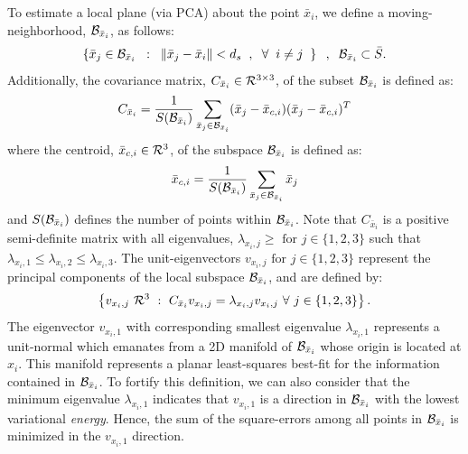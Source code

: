 		To estimate a local plane (via PCA) about the point $\bar{x}_{i}$, we define a moving-neighborhood, ${\cal B}_{\bar{x}_{i}}$, as follows:
			\newcommand{\xball}{\mmathcal{B}_{\bar{x}_{i}}}
			\begin{equation}
				\setwrap{ \bar{x}_{j} \in \xball \SSep : \SSep \norm{\bar{x}_{j}-\bar{x}_{i}} < d_{s}\SSep , \SSep \forall \SSep i\neq j \SSep }\SSep,\SSep \xball \subset \bar{S}.
				\label{eq::pca_ball}
			\end{equation}
		Additionally, the covariance matrix, $C_{\bar{x}_{i}} \in {\cal R}^{3\times3}$, of the subset $\xball$ is defined as:
			\begin{equation}
				C_{\bar{x}_{i}} =
				\frac{1}{S(\xball)} \sum_{\bar{x}_{j} \in \xball } ( \bar{x}_{j} - \bar{x}_{c,i} ) ( \bar{x}_{j} - \bar{x}_{c,i} )^{T}
				\label{eq::pca_cov}
			\end{equation}
		where the centroid, $\bar{x}_{c,i} \in {\cal R}^{3}$, of the subspace $\xball$ is defined as:
			\begin{equation}
				\bar{x}_{c,i} = 
				\frac{1}{S(\xball)} \sum_{\bar{x}_{j} \in \xball } \bar{x}_{j}
				\label{eq::pca_centroid}
			\end{equation}
		and $S(\xball)$ defines the number of points within $\xball$. Note that $C_{\bar{x}_{i}}$ is a positive semi-definite matrix with all eigenvalues, $\lambda_{x_{i},j}\geq\text{ for }j\in\{1,2,3\}$ such that $\lambda_{x_{i},1}\leq\lambda_{x_{i},2}\leq\lambda_{x_{i},3}$. The unit-eigenvectors $v_{x_{i},j}\text{ for }j\in\{1,2,3\}$ represent the principal components of the local subspace $\xball$, and are defined by:
			\begin{equation}
				\left\{ v_{x_{i},j}\text{ }{\cal R}^{3}\text{ }:\text{ }C_{\bar{x}_{i}} v_{x_{i},j} = \lambda_{x_{i},j} v_{x_{i},j}\text{ }\forall\text{ }j\in\{1,2,3\}\right\}.
				\label{eq::pca_eigen}
			\end{equation}
		The eigenvector $v_{x_{i},1}$ with corresponding smallest eigenvalue $\lambda_{x_{i},1}$ represents a unit-normal which emanates from a 2D manifold of $\xball$ whose origin is located at $x_{i}$. This manifold represents a planar least-squares best-fit for the information contained in $\xball$. To fortify this definition, we can also consider that the minimum eigenvalue $\lambda_{x_{i},1}$ indicates that $v_{x_{i},1}$ is a direction in $\xball$ with the lowest variational \emph{energy}. Hence, the sum of the square-errors among all points in $\xball$ is minimized in the $v_{x_{i},1}$ direction.

